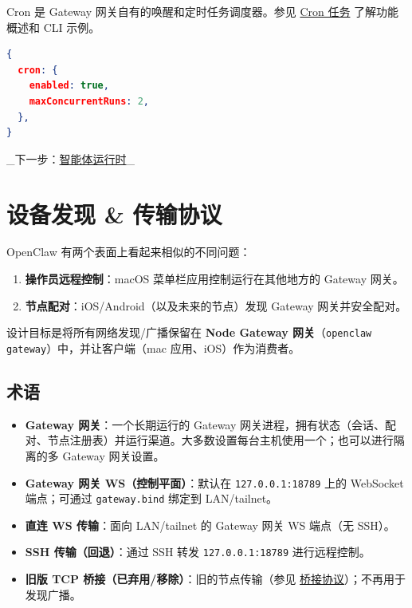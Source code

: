 Cron 是 Gateway 网关自有的唤醒和定时任务调度器。参见 \href{/automation/cron-jobs}{Cron 任务} 了解功能概述和 CLI 示例。

\begin{lstlisting}[language=json]
{
  cron: {
    enabled: true,
    maxConcurrentRuns: 2,
  },
}
\end{lstlisting}


\hrulefill


\_下一步：\href{/concepts/agent}{智能体运行时}\_ 


\clearpage

\section{设备发现 \& 传输协议}


OpenClaw 有两个表面上看起来相似的不同问题：

\begin{enumerate}
  \item \textbf{操作员远程控制}：macOS 菜单栏应用控制运行在其他地方的 Gateway 网关。
  \item \textbf{节点配对}：iOS/Android（以及未来的节点）发现 Gateway 网关并安全配对。
\end{enumerate}


设计目标是将所有网络发现/广播保留在 \textbf{Node Gateway 网关}（\texttt{openclaw gateway}）中，并让客户端（mac 应用、iOS）作为消费者。

\subsection{术语}


\begin{itemize}
  \item \textbf{Gateway 网关}：一个长期运行的 Gateway 网关进程，拥有状态（会话、配对、节点注册表）并运行渠道。大多数设置每台主机使用一个；也可以进行隔离的多 Gateway 网关设置。
  \item \textbf{Gateway 网关 WS（控制平面）}：默认在 \texttt{127.0.0.1:18789} 上的 WebSocket 端点；可通过 \texttt{gateway.bind} 绑定到 LAN/tailnet。
  \item \textbf{直连 WS 传输}：面向 LAN/tailnet 的 Gateway 网关 WS 端点（无 SSH）。
  \item \textbf{SSH 传输（回退）}：通过 SSH 转发 \texttt{127.0.0.1:18789} 进行远程控制。
  \item \textbf{旧版 TCP 桥接（已弃用/移除）}：旧的节点传输（参见 \href{/gateway/bridge-protocol}{桥接协议}）；不再用于发现广播。
\end{itemize}


